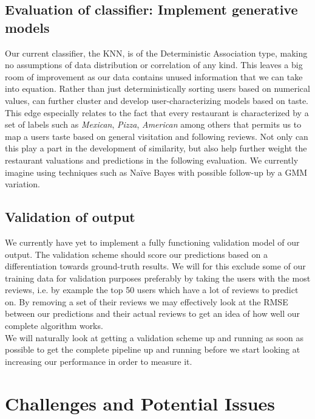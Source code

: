 \documentclass[10pt,twocolumn,letterpaper]{article}
\begin{document}
\subsection{Evaluation of classifier: Implement generative models}
Our current classifier, the KNN, is of the Deterministic Association type, making no assumptions of data distribution or correlation of any kind. This leaves a big room of improvement as our data contains unused information that we can take into equation. Rather than just deterministically sorting users based on numerical values, can further cluster and develop user-characterizing models based on taste. This edge especially relates to the fact that every restaurant is characterized by a set of labels such as \textit{Mexican}, \textit{Pizza}, \textit{American} among others that permits us to map a users taste based on general visitation and following reviews. Not only can this play a part in the development of similarity, but also help further weight the restaurant valuations and predictions in the following evaluation. We currently imagine using techniques such as Naïve Bayes with possible follow-up by a GMM variation.

\subsection{Validation of output}
We currently have yet to implement a fully functioning validation model of our output. The validation scheme should score our predictions based on a differentiation towards ground-truth results. We will for this exclude some of our training data for validation purposes preferably by taking the users with the most reviews, i.e. by example the top 50 users which have a lot of reviews to predict on. By removing a set of their reviews we may effectively look at the RMSE between our predictions and their actual reviews to get an idea of how well our complete algorithm works.
\\[.5em]
\indent We will naturally look at getting a validation scheme up and running as soon as possible to get the complete pipeline up and running before we start looking at increasing our performance in order to measure it.

\section{Challenges and Potential Issues}
\end{document}
